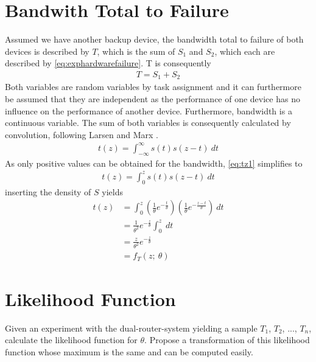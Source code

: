 \section{Bandwith Total to Failure}
Assumed we have another backup device, the bandwidth total to failure of both devices is described by $T$, which is the sum of $S_1$ and $S_2$, which each are described by \eqref{eq:exphardwarefailure}. T is consequently
\begin{equation}
\begin{split}
T = S_1 + S_2
\end{split}
\label{eq:T}
\end{equation}
Both variables are random variables by task assignment and it can furthermore be assumed that they are independent as the performance of one device has no influence on the performance of another device. Furthermore, bandwidth is a continuous variable. The sum of both variables is consequently calculated by convolution, following Larsen and Marx \cite[Theorem~3.8.3]{larsen2005introduction}.
\begin{equation}
\begin{split}
t(z) = \int_{-\infty}^\infty s(t)s(z-t)~dt
\end{split}
\label{eq:tz1}
\end{equation}
As only positive values can be obtained for the bandwidth, \eqref{eq:tz1} simplifies to 
\begin{equation}
\begin{split}
t(z) = \int_{0}^zs(t)s(z-t)~dt
\end{split}
\label{eq:tz2}
\end{equation}
inserting the density of $S$ yields
\begin{equation}
\begin{split}
t(z) 
&= \int_{0}^z \left(\frac{1}{\theta} e^{-\frac{t}{\theta}}\right)
\left(\frac{1}{\theta} e^{-\frac{z-t}{\theta}}\right)~dt\\
&= \frac{1}{\theta^2} e^{-\frac{z}{\theta}}\int_{0}^z~dt\\
&= \frac{z}{\theta^2} e^{-\frac{z}{\theta}}\\
&= f_T(z;~\theta)
\end{split}
\label{eq:tz3}
\end{equation}

\section{Likelihood Function}
Given an experiment with the dual-router-system yielding a sample $T_1$, $T_2$, ..., $T_n$, calculate the likelihood function for $\theta$. Propose a transformation of this likelihood function whose maximum is the same and can be computed easily.

